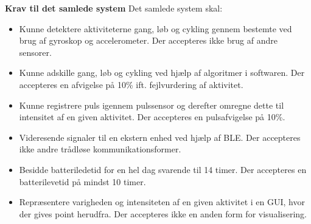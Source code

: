 \textbf{Krav til det samlede system} \newline
Det samlede system skal:
\begin{itemize}
	\item Kunne detektere aktiviteterne gang, løb og cykling gennem bestemte ved brug af gyroskop og accelerometer. Der accepteres ikke brug af andre sensorer.
	\item Kunne adskille gang, løb og cykling ved hjælp af algoritmer i softwaren. Der accepteres en afvigelse på 10\% ift. fejlvurdering af aktivitet.
	\item Kunne registrere puls igennem pulssensor og derefter omregne dette til intensitet af en given aktivitet. Der accepteres en pulsafvigelse på 10\%.
	\item Videresende signaler til en ekstern enhed ved hjælp af BLE. Der accepteres ikke andre trådløse kommunikationsformer.
	\item Besidde batteriledetid for en hel dag svarende til 14 timer. Der accepteres en batterilevetid på mindst 10 timer.
	\item Repræsentere varigheden og intensiteten af en given aktivitet i en GUI, hvor der gives point herudfra. Der accepteres ikke en anden form for visualisering. 
\end{itemize}

